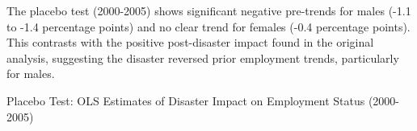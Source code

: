 \documentclass[serif, aspectratio=169]{beamer}
\newcommand{\returnbutton}[2]{%
  \vspace{-1.0cm}  %
  \hfill  %
  \hyperlink{#1}{%
    {\footnotesize\beamerbutton{#2}}%
  }%
  \vspace{0.3cm}  %
}
\begin{document}
\begin{frame}[label=employed_placebo]


The placebo test (2000-2005) shows significant negative pre-trends for males (-1.1 to -1.4 percentage points) and no clear trend for females (-0.4 percentage points). This contrasts with the positive post-disaster impact found in the original analysis, suggesting the disaster reversed prior employment trends, particularly for males.

\vspace{-1.5cm}
\returnbutton{employed}{Return}
\vspace{1.2cm}


\vspace{0.35cm}


\begin{table}[htbp]
\centering
\caption{Placebo Test: OLS Estimates of Disaster Impact on Employment Status (2000-2005)}

\vspace{-0.2cm}


\end{table}
\end{frame}
\end{document}
